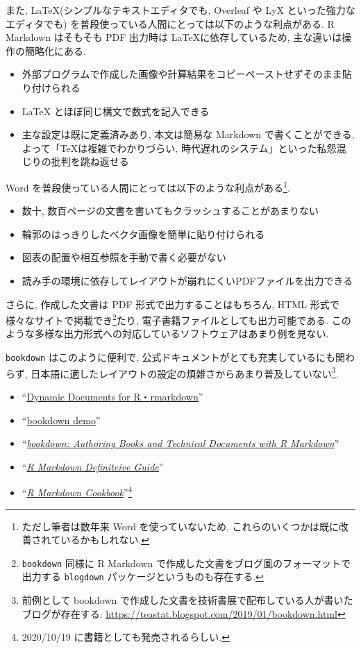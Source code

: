 \documentclass[
  nomag]{bxjsbook}
\providecommand{\tightlist}{%
  \setlength{\itemsep}{0pt}\setlength{\parskip}{0pt}}
\theoremstyle{definition}
\theoremstyle{definition}
\theoremstyle{definition}
\theoremstyle{remark}
\begin{document}
また, \LaTeX (シンプルなテキストエディタでも, Overleaf や LyX
といった強力なエディタでも)
を普段使っている人間にとっては以下のような利点がある. R Markdown
はそもそも PDF 出力時は \LaTeX に依存しているため,
主な違いは操作の簡略化にある.

\begin{itemize}
\tightlist
\item
  外部プログラムで作成した画像や計算結果をコピーペーストせずそのまま貼り付けられる
\item
  LaTeX とほぼ同じ構文で数式を記入できる
\item
  主な設定は既に定義済みあり, 本文は簡易な Markdown で書くことができる,
  よって「TeXは複雑でわかりづらい,
  時代遅れのシステム」といった私怨混じりの批判を跳ね返せる
\end{itemize}

Word を普段使っている人間にとっては以下のような利点がある\footnote{ただし筆者は数年来
  Word を使っていないため,
  これらのいくつかは既に改善されているかもしれない.}.

\begin{itemize}
\tightlist
\item
  数十, 数百ページの文書を書いてもクラッシュすることがあまりない
\item
  輪郭のはっきりしたベクタ画像を簡単に貼り付けられる
\item
  図表の配置や相互参照を手動で書く必要がない
\item
  読み手の環境に依存してレイアウトが崩れにくいPDFファイルを出力できる
\end{itemize}

さらに, 作成した文書は PDF 形式で出力することはもちろん, HTML
形式で様々なサイトで掲載でき\footnote{\texttt{bookdown} 同様に R
  Markdown で作成した文書をブログ風のフォーマットで出力する
  \texttt{blogdown} パッケージというものも存在する.}たり,
電子書籍ファイルとしても出力可能である.
このような多様な出力形式への対応しているソフトウェアはあまり例を見ない.

\texttt{bookdown} はこのように便利で,
公式ドキュメントがとても充実しているにも関わらず,
日本語に適したレイアウトの設定の煩雑さからあまり普及していない\footnote{前例として
  bookdown
  で作成した文書を技術書展で配布している人が書いたブログが存在する:
  \url{https://teastat.blogspot.com/2019/01/bookdown.html}}.

\begin{itemize}
\tightlist
\item
  ``\href{https://rmarkdown.rstudio.com/docs/index.html}{Dynamic
  Documents for R・rmarkdown}''
\item
  ``\href{https://github.com/rstudio/bookdown-demo}{bookdown demo}''
\item
  ``\href{https://bookdown.org/yihui/bookdown/}{\emph{bookdown:
  Authoring Books and Technical Documents with R Markdown}}''
\item
  ``\href{https://bookdown.org/yihui/rmarkdown/}{\emph{R Markdown
  Definiteive Guide}}''
\item
  ``\href{https://bookdown.org/yihui/rmarkdown-cookbook}{\emph{R
  Markdown Cookbook}}''\footnote{2020/10/19
    に書籍としても発売されるらしい.}
\end{itemize}
\end{document}
